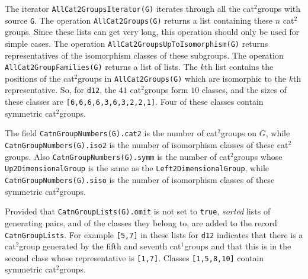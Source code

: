 \documentclass[a4paper,11pt]{report}
\begin{document}
{{{ The iterator \texttt{AllCat2GroupsIterator(G)} iterates through all the cat$^2$\texttt{}groups with source \texttt{G}. The operation \texttt{AllCat2Groups(G)} returns a list containing these $n$ cat$^2$\texttt{}groups. Since these lists can get very long, this
operation should only be used for simple cases. The operation \texttt{AllCat2GroupsUpToIsomorphism(G)} returns representatives of the isomorphism classes of these subgroups. The
operation \texttt{AllCat2GroupFamilies(G)} returns a list of lists. The $k$\texttt{}th list contains the positions of the cat$^2$\texttt{}groups in \texttt{AllCat2Groups(G)} which are isomorphic to the $k$\texttt{}th representative. So, for \texttt{d12}, the $41$ cat$^2$\texttt{}groups form $10$ classes, and the sizes of these classes are \texttt{[6,6,6,6,3,6,3,2,2,1]}. Four of these classes contain symmetric cat$^2$\texttt{}groups. 

 The field \texttt{CatnGroupNumbers(G).cat2} is the number of cat$^2$\texttt{}groups on $G$, while \texttt{CatnGroupNumbers(G).iso2} is the number of isomorphism classes of these cat$^2$\texttt{}groups. Also \texttt{CatnGroupNumbers(G).symm} is the number of cat$^2$\texttt{}groups whose \texttt{Up2DimensionalGroup} is the same as the \texttt{Left2DimensionalGroup}, while \texttt{CatnGroupNumbers(G).siso} is the number of isomorphism classes of these symmetric cat$^2$\texttt{}groups. 

 Provided that \texttt{CatnGroupLists(G).omit} is not set to \texttt{true}, \emph{sorted} lists of generating pairs, and of the classes they belong to, are added to the
record \texttt{CatnGroupLists}. For example \texttt{[5,7]} in these lists for \texttt{d12} indicates that there is a cat$^2$\texttt{}group generated by the fifth and seventh cat$^1$\texttt{}groups and that this is in the second class whose
representative is \texttt{[1,7]}. Classes \texttt{[1,5,8,10]} contain symmetric cat$^2$\texttt{}groups. }

 

 
\begin{Verbatim}[commandchars=!@|,fontsize=\small,frame=single,label=Example]
  

\end{Verbatim}}}
\end{document}
